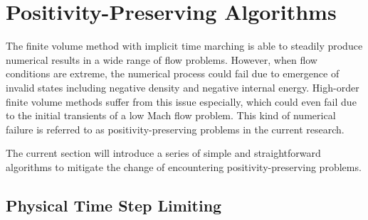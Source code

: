 \documentclass[preprint,12pt]{elsarticle}
\begin{document}
\section{Positivity-Preserving Algorithms}

The finite volume method with implicit time marching
is able to steadily produce numerical results in
a wide range of flow problems.
However, when flow conditions are extreme,
the numerical process could fail due to
emergence of invalid states including
negative density and negative internal energy.
High-order finite volume methods suffer from this issue especially,
which could even fail due to the initial transients
of a low Mach flow problem.
This kind of numerical failure is referred to
as positivity-preserving problems in the current research.

The current section will introduce a series of simple
and straightforward algorithms
to mitigate the change of encountering positivity-preserving problems.

\subsection{Physical Time Step Limiting}
\end{document}
